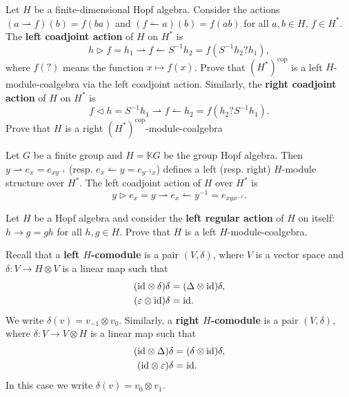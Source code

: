 \begin{exercise}
Let $H$ be a finite-dimensional Hopf algebra. Consider the actions
$(a\rightharpoonup f)(b)=f(ba)$ and $(f\leftharpoonup a)(b)=f(ab)$
for all $a,b\in H$, $f\in H^{*}$. The \textbf{left coadjoint action}
of $H$ on $H^{*}$ is 
\[
h\triangleright f=h_{1}\rightharpoonup f\leftharpoonup S^{-1}h_{2}=f(S^{-1}h_{2}?h_1),
\]
where $f(?)$ means the function $x\mapsto f(x)$. Prove that
$(H^*)^\mathrm{cop}$ is a left $H$-module-coalgebra via the left coadjoint
action. Similarly, the \textbf{right coadjoint action} of $H$ on $H^{*}$ is 
\[
f\triangleleft h=S^{-1}h_{1}\rightharpoonup f\leftharpoonup h_{2}=f(h_2?S^{-1}h_{1}).
\]
Prove that $H$ is a right $(H^*)^\mathrm{cop}$-module-coalgebra 
\end{exercise}

\begin{example}
Let $G$ be a finite group and $H=\mathbb{K}G$ be the group Hopf algebra. Then
$y\rightharpoonup e_{x}=e_{xy^{-1}}$ (resp. $e_{x}\leftharpoonup
y=e_{y^{-1}x}$) defines a left (resp. right) $H$-module structure over $H^{*}$.
The left coadjoint action of $H$ over $H^{*}$ is 
\[
y\triangleright e_{x}=y\rightharpoonup e_{x}\leftharpoonup y^{-1}=e_{xyx^{-1}}.
\]
\end{example}

\begin{exercise}
Let $H$ be a Hopf algebra and consider the \textbf{left regular action} of $H$ on itself:
$h\rightarrow g=gh$ for all
$h,g\in H$. Prove that $H$ is a left $H$-module-coalgebra. 
\end{exercise}


Recall that a \textbf{left $H$-comodule} is a pair $(V,\delta)$,
where $V$ is a vector space and $\delta:V\to H\otimes V$ is a linear
map such that 
\begin{align*}
(\mathrm{id}\otimes\delta)\delta & =(\Delta\otimes\mathrm{id})\delta,\\
(\varepsilon\otimes\mathrm{id})\delta & =\mathrm{id}.
\end{align*}
We write $\delta(v)=v_{-1}\otimes v_{0}$. Similarly, a \textbf{right
$H$-comodule} is a pair $(V,\delta)$, where $\delta:V\to V\otimes H$
is a linear map such that 
\begin{align*}
(\mathrm{id}\otimes\Delta)\delta & =(\delta\otimes\mathrm{id})\delta,\\
(\mathrm{id}\otimes\varepsilon)\delta & =\mathrm{id}.
\end{align*}
In this case we write $\delta(v)=v_{0}\otimes v_{1}$.

